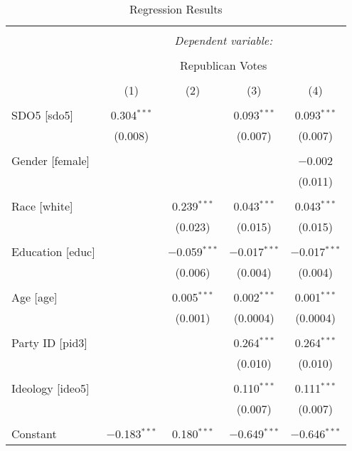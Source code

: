 
\begin{table}[!htbp] \centering 
  \caption{Regression Results} 
  \label{} 
\begin{tabular}{@{\extracolsep{5pt}}lcccc} 
\\[-1.8ex]\hline 
\hline \\[-1.8ex] 
 & \multicolumn{4}{c}{\textit{Dependent variable:}} \\ 
\cline{2-5} 
\\[-1.8ex] & \multicolumn{4}{c}{Republican Votes} \\ 
\\[-1.8ex] & (1) & (2) & (3) & (4)\\ 
\hline \\[-1.8ex] 
 SDO5 [sdo5] & 0.304$^{***}$ &  & 0.093$^{***}$ & 0.093$^{***}$ \\ 
  & (0.008) &  & (0.007) & (0.007) \\ 
  & & & & \\ 
 Gender [female] &  &  &  & $-$0.002 \\ 
  &  &  &  & (0.011) \\ 
  & & & & \\ 
 Race [white] &  & 0.239$^{***}$ & 0.043$^{***}$ & 0.043$^{***}$ \\ 
  &  & (0.023) & (0.015) & (0.015) \\ 
  & & & & \\ 
 Education [educ] &  & $-$0.059$^{***}$ & $-$0.017$^{***}$ & $-$0.017$^{***}$ \\ 
  &  & (0.006) & (0.004) & (0.004) \\ 
  & & & & \\ 
 Age [age] &  & 0.005$^{***}$ & 0.002$^{***}$ & 0.001$^{***}$ \\ 
  &  & (0.001) & (0.0004) & (0.0004) \\ 
  & & & & \\ 
 Party ID [pid3] &  &  & 0.264$^{***}$ & 0.264$^{***}$ \\ 
  &  &  & (0.010) & (0.010) \\ 
  & & & & \\ 
 Ideology [ideo5] &  &  & 0.110$^{***}$ & 0.111$^{***}$ \\ 
  &  &  & (0.007) & (0.007) \\ 
  & & & & \\ 
 Constant & $-$0.183$^{***}$ & 0.180$^{***}$ & $-$0.649$^{***}$ & $-$0.646$^{***}$ \\ 

\end{tabular}
\end{table}
